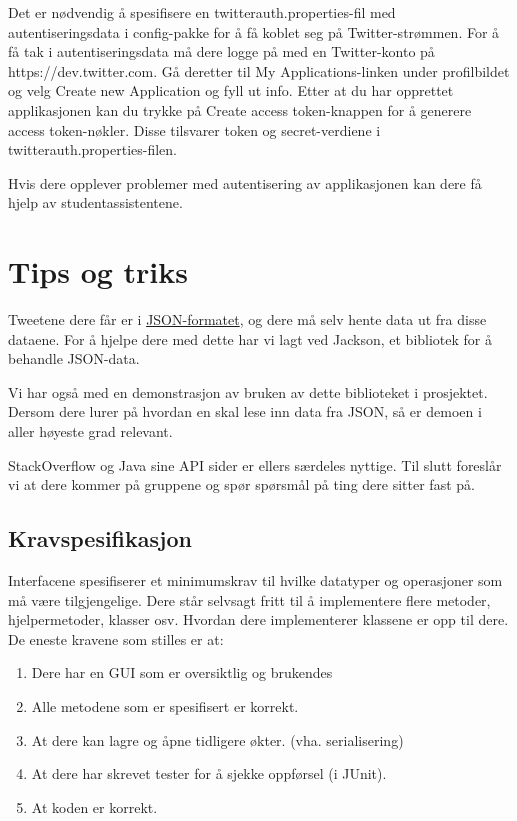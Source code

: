 \documentclass{article}
\begin{document}
Det er nødvendig å spesifisere en twitterauth.properties-fil med autentiseringsdata i config-pakke for å få koblet seg på Twitter-strømmen. For å få tak i autentiseringsdata må dere logge på med en Twitter-konto på https://dev.twitter.com. Gå deretter til My Applications-linken under profilbildet og velg Create new Application og fyll ut info. Etter at du har opprettet applikasjonen kan du trykke på Create access token-knappen for å generere access token-nøkler. Disse tilsvarer token og secret-verdiene i twitterauth.properties-filen.

Hvis dere opplever problemer med autentisering av applikasjonen kan dere få hjelp av studentassistentene.

\section{Tips og triks}
Tweetene dere får er i \href{http://www.json.org/}{JSON-formatet}, og dere må selv hente data ut fra disse dataene.
For å hjelpe dere med dette har vi lagt ved Jackson, et bibliotek for å behandle JSON-data.

Vi har også med en demonstrasjon av bruken av dette biblioteket i prosjektet.
Dersom dere lurer på hvordan en skal lese inn data fra JSON, så er demoen i aller høyeste grad relevant.

StackOverflow og Java sine API sider er ellers særdeles nyttige.
Til slutt foreslår vi at dere kommer på gruppene og spør spørsmål på ting dere sitter fast på.

\subsection{Kravspesifikasjon}
Interfacene spesifiserer et minimumskrav til hvilke datatyper og operasjoner som må være tilgjengelige. Dere står selvsagt fritt til å implementere flere metoder, hjelpermetoder, klasser osv. Hvordan dere implementerer klassene er opp til dere. De eneste kravene som stilles er at:
\begin{enumerate}
\item Dere har en GUI som er oversiktlig og brukendes
\item Alle metodene som er spesifisert er korrekt.
\item At dere kan lagre og åpne tidligere økter. (vha. serialisering)
\item At dere har skrevet tester for å sjekke oppførsel (i JUnit).
\item At koden er korrekt.
\end{enumerate}
\end{document}

